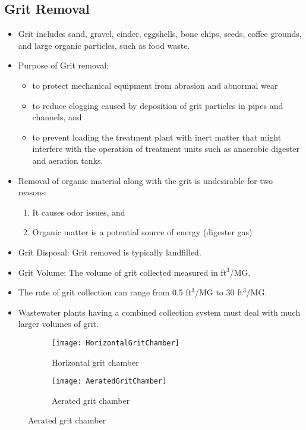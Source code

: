 \documentclass{article}
\begin{document}
		\subsection{Grit Removal}
						\begin{itemize}
							\item Grit includes sand, gravel, cinder, eggshells, bone chips, seeds, coffee grounds, and large organic particles, such as food waste.
							\item Purpose of Grit removal:
								\begin{itemize} 
									\item to protect mechanical equipment from abrasion and abnormal wear 
									\item to reduce clogging caused by deposition of grit particles in pipes and channels, and 
				\item to prevent loading the treatment plant with inert matter that might interfere with the operation of treatment units such as anaerobic digester and aeration tanks.
			\end{itemize}
		\item Removal of organic material along with the grit is undesirable for two reasons:
			\begin{enumerate}
				\item It causes odor issues, and 
				\item Organic matter is a potential source of energy (digester gas)
			\end{enumerate}
		\item Grit Disposal: Grit removed is typically landfilled.
		\item Grit Volume:  The volume of grit collected measured in ft$^3$/MG.
		\item The rate of grit collection can range from 0.5 ft$^3$/MG to 30 ft$^3$/MG.
		\item Wastewater plants having a combined collection system must deal with much larger volumes of grit.
\end{itemize}

\begin{figure}[h!]
  \centering
  \begin{subfigure}[b]{0.46\linewidth}
    \texttt{[image: HorizontalGritChamber]}
    \caption{Horizontal grit chamber}
  \end{subfigure}
  \hspace{0.2cm}
  \begin{subfigure}[b]{0.5\linewidth}
    \texttt{[image: AeratedGritChamber]}
    \caption{Aerated grit chamber}
  \end{subfigure}
\end{figure} 					
\end{document}
